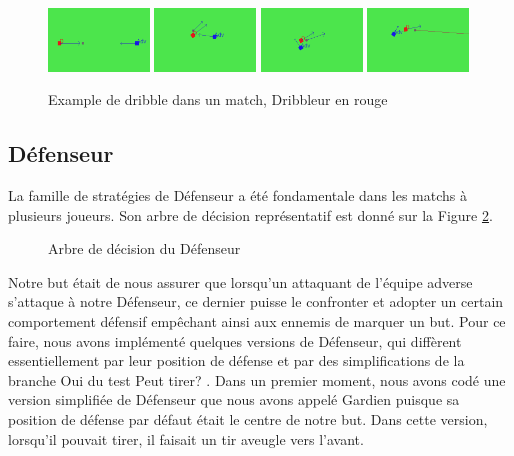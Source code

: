 \documentclass[a4paper,12pt]{article}
\begin{document}
\begin{figure}[ht]
\centering
\includegraphics[width = 0.24\textwidth]{dribble1_coupe}
\includegraphics[width = 0.24\textwidth]{dribble2_coupe}
\includegraphics[width = 0.24\textwidth]{dribble3_coupe}
\includegraphics[width = 0.24\textwidth]{dribble4_coupe}
\caption{Example de dribble dans un match, Dribbleur en rouge}
\label{Figure5}
\end{figure}

\subsection{Défenseur}

La famille de stratégies de Défenseur a été fondamentale dans les matchs à plusieurs joueurs. Son arbre de décision représentatif est donné sur la Figure \ref{Figure6}. 

\begin{figure}[ht]
\centering

\caption{Arbre de décision du Défenseur}
\label{Figure6}
\end{figure}

Notre but était de nous assurer que lorsqu’un attaquant de l’équipe adverse s’attaque à notre Défenseur, ce dernier puisse le confronter et adopter un certain comportement défensif empêchant ainsi aux ennemis de marquer un but. Pour ce faire, nous avons implémenté quelques versions de Défenseur, qui diffèrent essentiellement par leur position de défense et par des simplifications de la branche \og Oui \fg{} du test \og Peut tirer? \fg. Dans un premier moment, nous avons codé une version simplifiée de Défenseur que nous avons appelé Gardien puisque sa position de défense par défaut était le centre de notre but. Dans cette version, lorsqu'il pouvait tirer, il faisait un tir aveugle vers l'avant.
\end{document}
